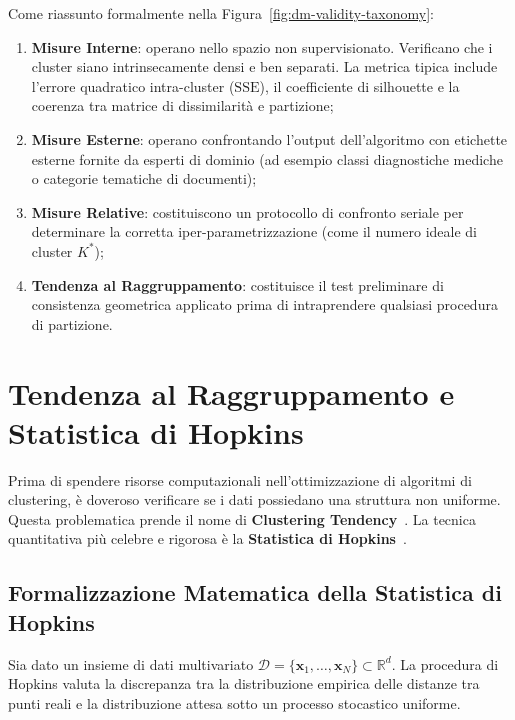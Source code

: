 Come riassunto formalmente nella Figura~\ref{fig:dm-validity-taxonomy}:
\begin{enumerate}
    \item \textbf{Misure Interne}: operano nello spazio non supervisionato. Verificano che i cluster siano intrinsecamente densi e ben separati. La metrica tipica include l'errore quadratico intra-cluster ($\mathrm{SSE}$), il coefficiente di silhouette e la coerenza tra matrice di dissimilarità e partizione;
    \item \textbf{Misure Esterne}: operano confrontando l'output dell'algoritmo con etichette esterne fornite da esperti di dominio (ad esempio classi diagnostiche mediche o categorie tematiche di documenti);
    \item \textbf{Misure Relative}: costituiscono un protocollo di confronto seriale per determinare la corretta iper-parametrizzazione (come il numero ideale di cluster $K^*$);
    \item \textbf{Tendenza al Raggruppamento}: costituisce il test preliminare di consistenza geometrica applicato prima di intraprendere qualsiasi procedura di partizione.
\end{enumerate}

\FloatBarrier
\section{Tendenza al Raggruppamento e Statistica di Hopkins}
\label{sec:dm-hopkins-statistic}

Prima di spendere risorse computazionali nell'ottimizzazione di algoritmi di clustering, è doveroso verificare se i dati possiedano una struttura non uniforme. Questa problematica prende il nome di \textbf{Clustering Tendency}~\cite{tan2018}. La tecnica quantitativa più celebre e rigorosa è la \textbf{Statistica di Hopkins}~\cite{hopkins1954, jain1988}.

\FloatBarrier
\subsection{Formalizzazione Matematica della Statistica di Hopkins}
Sia dato un insieme di dati multivariato $\mathcal{D} = \{\mathbf{x}_1, \dots, \mathbf{x}_N\} \subset \mathbb{R}^d$. La procedura di Hopkins valuta la discrepanza tra la distribuzione empirica delle distanze tra punti reali e la distribuzione attesa sotto un processo stocastico uniforme.

